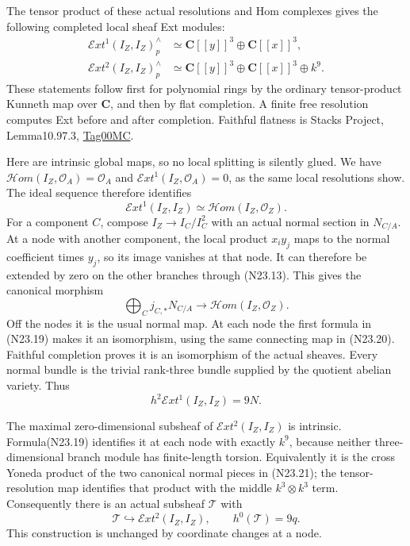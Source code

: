 The tensor product of these actual resolutions and Hom complexes
gives the following completed local sheaf Ext modules:
\[
 \begin{split}
 \mathcal E xt^1(I_Z,I_Z)^{\wedge}_p
       &\simeq \mathbf C[[y]]^3\oplus\mathbf C[[x]]^3,\\
 \mathcal E xt^2(I_Z,I_Z)^{\wedge}_p
       &\simeq \mathbf C[[y]]^3\oplus\mathbf C[[x]]^3\oplus k^9.
 \end{split}                                                  \tag{N23.19}
\]
These statements follow first for polynomial rings by the ordinary
tensor-product Kunneth map over $\mathbf C$, and then by flat
completion. A finite free resolution computes Ext before and after
completion. Faithful flatness is Stacks Project, Lemma10.97.3,
\href{https://stacks.math.columbia.edu/tag/00MC}{Tag00MC}.

Here are intrinsic global maps, so no local splitting is silently
glued. We have $\mathcal H om(I_Z,\mathcal O_A)=\mathcal O_A$
and $\mathcal E xt^1(I_Z,\mathcal O_A)=0$, as the same local
resolutions show. The ideal sequence therefore identifies
\[
 \mathcal E xt^1(I_Z,I_Z)
                      \simeq\mathcal H om(I_Z,\mathcal O_Z).
                                                               \tag{N23.20}
\]
For a component $C$, compose $I_Z\to I_C/I_C^2$ with an actual
normal section in $N_{C/A}$. At a node with another component,
the local product $x_i y_j$ maps to the normal coefficient
times $y_j$, so its image vanishes at that node. It can therefore
be extended by zero on the other branches through (N23.13).
This gives the canonical morphism
\[
 \bigoplus_C j_{C,*}N_{C/A}
       \longrightarrow\mathcal H om(I_Z,\mathcal O_Z).
                                                               \tag{N23.21}
\]
Off the nodes it is the usual normal map. At each node the
first formula in (N23.19) makes it an isomorphism, using the
same connecting map in (N23.20). Faithful completion proves
it is an isomorphism of the actual sheaves. Every normal bundle
is the trivial rank-three bundle supplied by the quotient
abelian variety. Thus
\[
                 h^2\mathcal E xt^1(I_Z,I_Z)=9N.             \tag{N23.22}
\]

The maximal zero-dimensional subsheaf of
$\mathcal E xt^2(I_Z,I_Z)$ is intrinsic. Formula(N23.19)
identifies it at each node with exactly $k^9$, because neither
three-dimensional branch module has finite-length torsion.
Equivalently it is the cross Yoneda product of the two canonical
normal pieces in (N23.21); the tensor-resolution map identifies
that product with the middle $k^3\otimes k^3$ term. Consequently
there is an actual subsheaf $\mathcal T$ with
\[
 \mathcal T\hookrightarrow\mathcal E xt^2(I_Z,I_Z),\qquad
                     h^0(\mathcal T)=9q.                    \tag{N23.23}
\]
This construction is unchanged by coordinate changes at a node.

